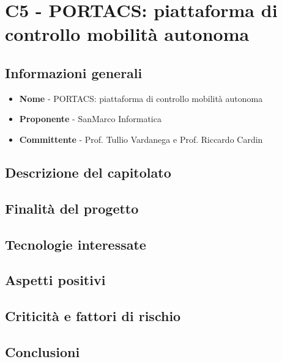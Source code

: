 \chapter{C5 - PORTACS: piattaforma di controllo mobilità autonoma}
\section{Informazioni generali}
\begin{itemize}
	\item \textbf{Nome} - PORTACS: piattaforma di controllo mobilità autonoma
	\item \textbf{Proponente} - SanMarco Informatica
	\item \textbf{Committente} - Prof. Tullio Vardanega e Prof. Riccardo Cardin
\end{itemize}
\section{Descrizione del capitolato}
\section{Finalità del progetto}
\section{Tecnologie interessate}
\section{Aspetti positivi}
\section{Criticità e fattori di rischio}
\section{Conclusioni}